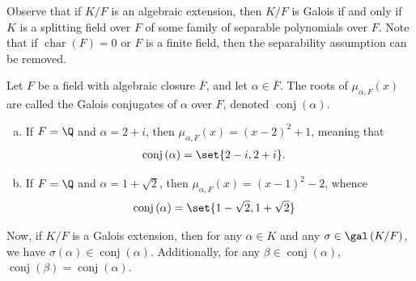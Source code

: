 \documentclass[10pt]{mypackage}
\begin{document}
Observe that if $K/F$ is an algebraic extension, then $K/F$ is Galois if and only if $K$ is a splitting field over $F$ of some family of separable polynomials over $F$. Note that if $\operatorname{char}\left( F \right) = 0$ or $F$ is a finite field, then the separability assumption can be removed.
\begin{definition}
  Let $F$ be a field with algebraic closure $ \overline{F} $, and let $\alpha\in \overline{F}$. The roots of $\mu_{\alpha, F}(x)$ are called the Galois conjugates of $\alpha$ over $F$, denoted $\operatorname{conj}\left( \alpha \right)$.
\end{definition}
\begin{example}\hfill
  \begin{enumerate}[(a)]
    \item If $F = \Q$ and $\alpha = 2 + i$, then $\mu_{\alpha,F}(x) = \left( x-2 \right)^2 + 1$, meaning that
      \begin{align*}
        \operatorname{conj}\left( \alpha \right) &= \set{2-i,2+i}.
      \end{align*}
    \item If $F = \Q$ and $\alpha = 1 + \sqrt{2}$, then $\mu_{\alpha,F}(x) = \left( x-1 \right)^2 - 2$, whence
      \begin{align*}
        \operatorname{conj}\left( \alpha \right) &= \set{1-\sqrt{2},1+\sqrt{2}}
      \end{align*}
  \end{enumerate}
\end{example}
Now, if $K/F$ is a Galois extension, then for any $\alpha\in K$ and any $\sigma\in \gal\left( K/F \right)$, we have $\sigma\left( \alpha \right)\in \operatorname{conj}\left( \alpha \right)$. Additionally, for any $\beta\in \operatorname{conj}\left( \alpha \right)$, $\operatorname{conj}\left( \beta \right) = \operatorname{conj}\left( \alpha \right)$.
\end{document}
